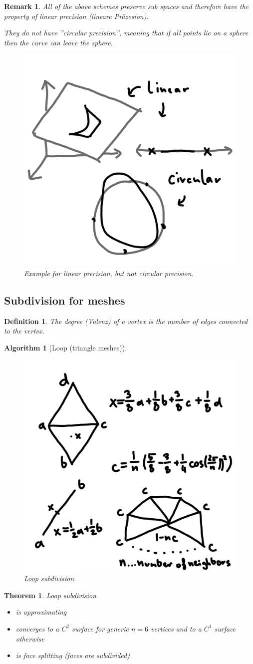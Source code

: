 \documentclass[]{article}
\newtheorem{theorem}{Theorem}
\newtheorem{definition}{Definition}
\newtheorem{algorithm}{Algorithm}
\newtheorem{remark}{Remark}
\begin{document}
\begin{remark}
	All of the above schemes preserve sub spaces and therefore have the property of linear precision (lineare Präzesion).
	
	They do not have ''circular precision'', meaning that if all points lie on a sphere then the curve can leave the sphere.
	
	\begin{figure}[h!]
		\centering
		\includegraphics[width=0.3\linewidth]{figures/precision}
		\caption{Example for linear precision, but not circular precision.}
		\label{fig:precision}
	\end{figure}
\end{remark}

\subsection{Subdivision for meshes}

\begin{definition}
	The degree (Valenz) of a vertex is the number of edges connected to the vertex.
\end{definition}

\begin{algorithm}[Loop (triangle meshes)]
	\begin{figure}[h!]
		\centering
		\includegraphics[width=0.3\linewidth]{figures/loop}
		\caption{Loop subdivision.}
		\label{fig:loop}
	\end{figure}
\end{algorithm}

\begin{theorem}
	Loop subdivision
	\begin{itemize}
		\item is approximating
		\item converges to a $C^2$ surface for generic $n=6$ vertices and to a $C^1$ surface otherwise
		\item is face splitting (faces are subdivided)
	\end{itemize}
\end{theorem}
\end{document}
